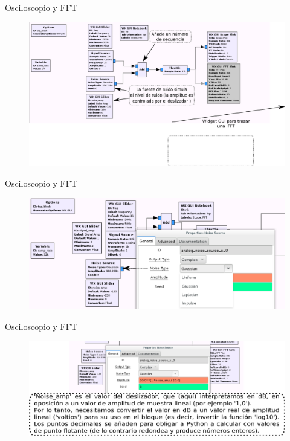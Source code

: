 \begin{frame}{Osciloscopio y FFT}
\begin{figure}[H]
\vspace{-4mm}
\centering
\includegraphics[width=1.1\textwidth]{parte1/lab2/pdf/lab2_2.pdf}
\end{figure}
\end{frame}

\begin{frame}{Osciloscopio y FFT}
\begin{figure}[H]
\centering
\includegraphics[width=1.055\textwidth]{parte1/lab2/pdf/lab2_3.pdf}
\end{figure}
\end{frame}

\begin{frame}{Osciloscopio y FFT}
\begin{figure}[H]
\centering
\includegraphics[width=1.055\textwidth]{parte1/lab2/pdf/lab2_4.pdf}
\end{figure}
\end{frame}

